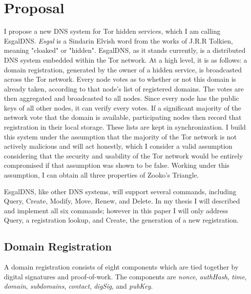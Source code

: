 \documentclass[journal]{IEEEtran}
\begin{document}
\section{Proposal}

I propose a new DNS system for Tor hidden services, which I am calling EsgalDNS. \textit{Esgal} is a Sindarin Elvish word from the works of J.R.R Tolkien, meaning "cloaked" or "hidden". EsgalDNS, as it stands currently, is a distributed DNS system embedded within the Tor network. At a high level, it is as follows: a domain registration, generated by the owner of a hidden service, is broadcasted across the Tor network. Every node votes as to whether or not this domain is already taken, according to that node's list of registered domains. The votes are then aggregated and broadcasted to all nodes. Since every node has the public keys of all other nodes, it can verify every votes. If a significant majority of the network vote that the domain is available, participating nodes then record that registration in their local storage. These lists are kept in synchronization. I build this system under the assumption that the majority of the Tor network is not actively malicious and will act honestly, which I consider a valid assumption considering that the security and usability of the Tor network would be entirely compromised if that assumption was shown to be false. Working under this assumption, I can obtain all three properties of Zooko's Triangle.

EsgalDNS, like other DNS systems, will support several commands, including Query, Create, Modify, Move, Renew, and Delete. In my thesis I will described and implement all six commands; however in this paper I will only address Query, a registration lookup, and Create, the generation of a new registration.

\subsection{Domain Registration}

A domain registration consists of eight components which are tied together by digital signatures and proof-of-work. The components are \textit{nonce}, \textit{authHash}, \textit{time}, \textit{domain}, \textit{subdomains}, \textit{contact}, \textit{digSig}, and \textit{pubKey}.
\end{document}
